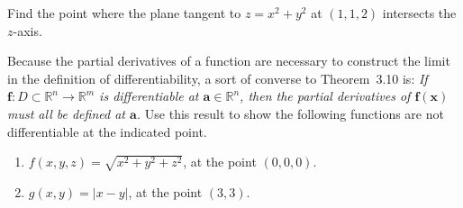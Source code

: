 \documentclass{ximera}
\begin{document}
\begin{problem}
Find the point where the plane tangent to $z = x^2+y^2$ at $(1,1,2)$ intersects the $z$-axis.
\end{problem}

\begin{problem}
Because the partial derivatives of a function are necessary to construct the limit in the definition of differentiability, a sort of converse to Theorem~3.10 is: \textit{ If $\mathbf{f}: D \subset \mathbb{R}^{n} \to \mathbb{R}^{m}$ is differentiable at $\mathbf{a} \in \mathbb{R}^{n}$, then the partial derivatives of $\mathbf{f}(\mathbf{x})$ must all be defined at $\mathbf{a}$. }  Use this result to show the following functions are not differentiable at the indicated point.

\begin{enumerate}

\item $f(x,y,z) = \sqrt{x^{2}+y^{2}+z^2}$, at the point $(0,0,0)$.\\

\item $g(x,y) = |x-y|$, at the point $(3,3)$.\\

\end{enumerate}

\end{problem}
\end{document}
